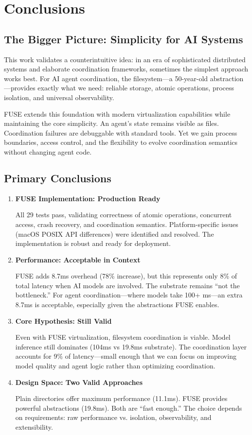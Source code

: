\documentclass[11pt]{article}
\begin{document}
\section{Conclusions}

\subsection{The Bigger Picture: Simplicity for AI Systems}

This work validates a counterintuitive idea: in an era of sophisticated distributed systems and elaborate coordination frameworks, sometimes the simplest approach works best. For AI agent coordination, the filesystem---a 50-year-old abstraction---provides exactly what we need: reliable storage, atomic operations, process isolation, and universal observability.

FUSE extends this foundation with modern virtualization capabilities while maintaining the core simplicity. An agent's state remains visible as files. Coordination failures are debuggable with standard tools. Yet we gain process boundaries, access control, and the flexibility to evolve coordination semantics without changing agent code.

\subsection{Primary Conclusions}

\begin{enumerate}
\item \textbf{FUSE Implementation: Production Ready}
  
  All 29 tests pass, validating correctness of atomic operations, concurrent access, crash recovery, and coordination semantics. Platform-specific issues (macOS POSIX API differences) were identified and resolved. The implementation is robust and ready for deployment.

\item \textbf{Performance: Acceptable in Context}
  
  FUSE adds 8.7ms overhead (78\% increase), but this represents only 8\% of total latency when AI models are involved. The substrate remains ``not the bottleneck.'' For agent coordination---where models take 100+ ms---an extra 8.7ms is acceptable, especially given the abstractions FUSE enables.

\item \textbf{Core Hypothesis: Still Valid}
  
  Even with FUSE virtualization, filesystem coordination is viable. Model inference still dominates (104ms vs 19.8ms substrate). The coordination layer accounts for 9\% of latency---small enough that we can focus on improving model quality and agent logic rather than optimizing coordination.

\item \textbf{Design Space: Two Valid Approaches}
  
  Plain directories offer maximum performance (11.1ms). FUSE provides powerful abstractions (19.8ms). Both are ``fast enough.'' The choice depends on requirements: raw performance vs. isolation, observability, and extensibility.
\end{enumerate}
\end{document}
